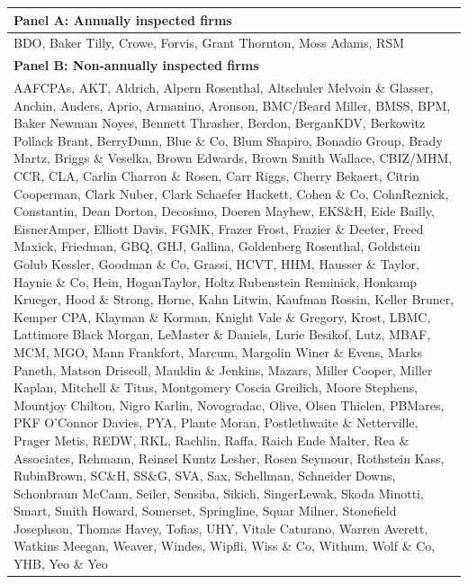 
\begin{tabular}{@{}p{14cm}@{}}
\toprule
\textbf{Panel A: Annually inspected firms} \\
\midrule
BDO, Baker Tilly, Crowe, Forvis, Grant Thornton, Moss Adams, RSM \\
\addlinespace[1em]
\textbf{Panel B: Non-annually inspected firms} \\
\midrule
AAFCPAs, AKT, Aldrich, Alpern Rosenthal, Altschuler Melvoin \& Glasser, Anchin, Anders, Aprio, Armanino, Aronson, BMC/Beard Miller, BMSS, BPM, Baker Newman Noyes, Bennett Thrasher, Berdon, BerganKDV, Berkowitz Pollack Brant, BerryDunn, Blue \& Co, Blum Shapiro, Bonadio Group, Brady Martz, Briggs \& Veselka, Brown Edwards, Brown Smith Wallace, CBIZ/MHM, CCR, CLA, Carlin Charron \& Rosen, Carr Riggs, Cherry Bekaert, Citrin Cooperman, Clark Nuber, Clark Schaefer Hackett, Cohen \& Co, CohnReznick, Constantin, Dean Dorton, Decosimo, Doeren Mayhew, EKS\&H, Eide Bailly, EisnerAmper, Elliott Davis, FGMK, Frazer Frost, Frazier \& Deeter, Freed Maxick, Friedman, GBQ, GHJ, Gallina, Goldenberg Rosenthal, Goldstein Golub Kessler, Goodman \& Co, Grassi, HCVT, HHM, Hausser \& Taylor, Haynie \& Co, Hein, HoganTaylor, Holtz Rubenstein Reminick, Honkamp Krueger, Hood \& Strong, Horne, Kahn Litwin, Kaufman Rossin, Keller Bruner, Kemper CPA, Klayman \& Korman, Knight Vale \& Gregory, Krost, LBMC, Lattimore Black Morgan, LeMaster \& Daniels, Lurie Besikof, Lutz, MBAF, MCM, MGO, Mann Frankfort, Marcum, Margolin Winer \& Evens, Marks Paneth, Matson Driscoll, Mauldin \& Jenkins, Mazars, Miller Cooper, Miller Kaplan, Mitchell \& Titus, Montgomery Coscia Greilich, Moore Stephens, Mountjoy Chilton, Nigro Karlin, Novogradac, Olive, Olsen Thielen, PBMares, PKF O'Connor Davies, PYA, Plante Moran, Postlethwaite \& Netterville, Prager Metis, REDW, RKL, Rachlin, Raffa, Raich Ende Malter, Rea \& Associates, Rehmann, Reinsel Kuntz Lesher, Rosen Seymour, Rothstein Kass, RubinBrown, SC\&H, SS\&G, SVA, Sax, Schellman, Schneider Downs, Schonbraun McCann, Seiler, Sensiba, Sikich, SingerLewak, Skoda Minotti, Smart, Smith Howard, Somerset, Springline, Squar Milner, Stonefield Josephson, Thomas Havey, Tofias, UHY, Vitale Caturano, Warren Averett, Watkins Meegan, Weaver, Windes, Wipfli, Wiss \& Co, Withum, Wolf \& Co, YHB, Yeo \& Yeo \\
\bottomrule
\end{tabular}
